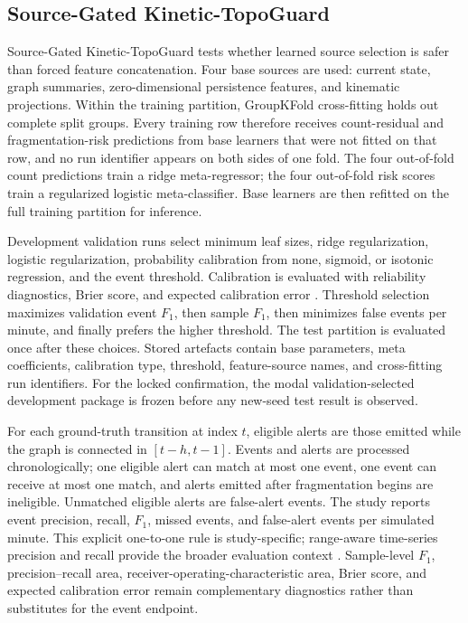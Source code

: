 \documentclass[final,5p,times,twocolumn]{elsarticle}
\begin{document}
\subsection{Source-Gated Kinetic-TopoGuard}

Source-Gated Kinetic-TopoGuard tests whether learned source selection is safer than forced
feature concatenation. Four base sources are used: current state, graph summaries,
zero-dimensional persistence features, and kinematic projections. Within the training
partition, GroupKFold cross-fitting holds out complete split groups. Every training row
therefore receives count-residual and fragmentation-risk predictions from base learners
that were not fitted on that row, and no run identifier appears on both sides of one fold.
The four out-of-fold count predictions train a ridge meta-regressor; the four out-of-fold
risk scores train a regularized logistic meta-classifier. Base learners are then refitted
on the full training partition for inference.

Development validation runs select minimum leaf sizes, ridge regularization, logistic
regularization, probability calibration from none, sigmoid, or isotonic regression, and the
event threshold. Calibration is evaluated with reliability diagnostics, Brier score, and
expected calibration error \cite{brier1950verification,guo2017calibration}. Threshold selection maximizes validation event $F_1$, then sample $F_1$,
then minimizes false events per minute, and finally prefers the higher threshold. The test
partition is evaluated once after these choices. Stored artefacts contain base parameters,
meta coefficients, calibration type, threshold, feature-source names, and cross-fitting
run identifiers. For the locked confirmation, the modal validation-selected development
package is frozen before any new-seed test result is observed.

For each ground-truth transition at index $t$, eligible alerts are those emitted while the
graph is connected in $[t-h,t-1]$. Events and alerts are processed chronologically; one
eligible alert can match at most one event, one event can receive at most one match, and
alerts emitted after fragmentation begins are ineligible. Unmatched eligible alerts are
false-alert events. The study reports event precision, recall, $F_1$, missed events, and
false-alert events per simulated minute. This explicit one-to-one rule is study-specific;
range-aware time-series precision and recall provide the broader evaluation context
\cite{tatbul2018precision}. Sample-level $F_1$, precision--recall area,
receiver-operating-characteristic area, Brier score, and expected calibration error remain
complementary diagnostics rather than substitutes for the event endpoint.
\end{document}
